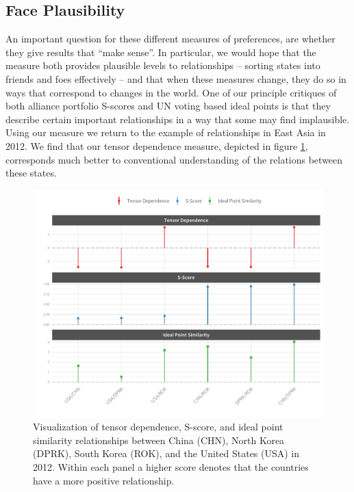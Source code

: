 \documentclass[12pt,pdflatex]{elsarticle}
\begin{document}
\subsection*{Face Plausibility}

An important question for these different measures of preferences, are whether they give results that ``make sense''. In particular, we would hope that the measure both provides plausible levels to relationships -- sorting states into friends and foes effectively -- and that when these measures change, they do so in ways that correspond to changes in the world. One of our principle critiques of both alliance portfolio S-scores and UN voting based ideal points is that they describe certain important relationships in a way that some may find implausible. Using our measure we return to the example of relationships in East Asia in 2012. We find that our tensor dependence measure, depicted in figure \ref{korea:withus}, corresponds much better to conventional understanding of the relations between these states.

\begin{figure}[ht]
\includegraphics[width=1\textwidth]{idPtScoreLatAngleViz}
\caption{Visualization of tensor dependence, S-score, and ideal point similarity relationships between China (CHN), North Korea (DPRK), South Korea (ROK), and the United States (USA) in 2012. Within each panel a higher score denotes that the countries have a more positive relationship.}
\label{korea:withus}
\end{figure}
\end{document}
